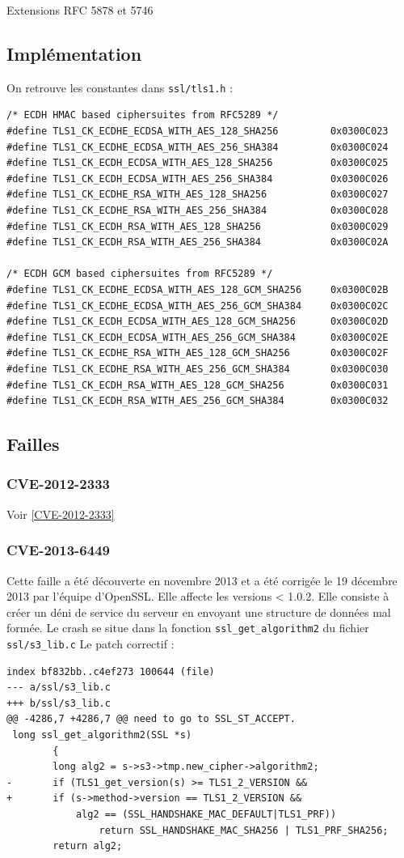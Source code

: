 \documentclass[a4paper,11pt,french]{article}
\begin{document}
Extensions RFC 5878 et 5746
\subsection{Implémentation}

On retrouve les constantes dans \verb+ssl/tls1.h+ :
\begin{verbatim}
/* ECDH HMAC based ciphersuites from RFC5289 */
#define TLS1_CK_ECDHE_ECDSA_WITH_AES_128_SHA256         0x0300C023
#define TLS1_CK_ECDHE_ECDSA_WITH_AES_256_SHA384         0x0300C024
#define TLS1_CK_ECDH_ECDSA_WITH_AES_128_SHA256          0x0300C025
#define TLS1_CK_ECDH_ECDSA_WITH_AES_256_SHA384          0x0300C026
#define TLS1_CK_ECDHE_RSA_WITH_AES_128_SHA256           0x0300C027
#define TLS1_CK_ECDHE_RSA_WITH_AES_256_SHA384           0x0300C028
#define TLS1_CK_ECDH_RSA_WITH_AES_128_SHA256            0x0300C029
#define TLS1_CK_ECDH_RSA_WITH_AES_256_SHA384            0x0300C02A

/* ECDH GCM based ciphersuites from RFC5289 */
#define TLS1_CK_ECDHE_ECDSA_WITH_AES_128_GCM_SHA256	    0x0300C02B
#define TLS1_CK_ECDHE_ECDSA_WITH_AES_256_GCM_SHA384	    0x0300C02C
#define TLS1_CK_ECDH_ECDSA_WITH_AES_128_GCM_SHA256      0x0300C02D
#define TLS1_CK_ECDH_ECDSA_WITH_AES_256_GCM_SHA384      0x0300C02E
#define TLS1_CK_ECDHE_RSA_WITH_AES_128_GCM_SHA256       0x0300C02F
#define TLS1_CK_ECDHE_RSA_WITH_AES_256_GCM_SHA384       0x0300C030
#define TLS1_CK_ECDH_RSA_WITH_AES_128_GCM_SHA256        0x0300C031
#define TLS1_CK_ECDH_RSA_WITH_AES_256_GCM_SHA384        0x0300C032
\end{verbatim}

\subsection{Failles}
\subsubsection{CVE-2012-2333}

Voir \ref{CVE-2012-2333}

\subsubsection{CVE-2013-6449}

Cette faille a été découverte en novembre 2013 et a été corrigée le 19 décembre 2013 par l'équipe d'OpenSSL.
Elle affecte les versions < 1.0.2. Elle consiste à créer un déni de service du serveur en envoyant une structure de données mal formée. Le crash se situe dans la fonction \verb+ssl_get_algorithm2+ du fichier \verb+ssl/s3_lib.c+
Le patch correctif :
\begin{Verbatim}
index bf832bb..c4ef273 100644 (file)
--- a/ssl/s3_lib.c
+++ b/ssl/s3_lib.c
@@ -4286,7 +4286,7 @@ need to go to SSL_ST_ACCEPT.
 long ssl_get_algorithm2(SSL *s)
        {
        long alg2 = s->s3->tmp.new_cipher->algorithm2;
-       if (TLS1_get_version(s) >= TLS1_2_VERSION &&
+       if (s->method->version == TLS1_2_VERSION &&
            alg2 == (SSL_HANDSHAKE_MAC_DEFAULT|TLS1_PRF))
                return SSL_HANDSHAKE_MAC_SHA256 | TLS1_PRF_SHA256;
        return alg2;
\end{Verbatim}
\end{document}
